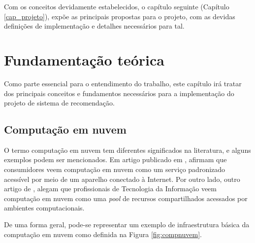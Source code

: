 \documentclass[
	12pt,				%
	openright,			%
	twoside,			%
	a4paper,			%
	english,			%
	french,				%
	spanish,			%
	brazil				%
	]{abntex2}
\begin{document}
Com os conceitos devidamente estabelecidos, o capítulo seguinte (Capítulo \ref{cap_projeto}), expõe as principais propostas para o projeto, com as devidas definições de implementação e detalhes necessários para tal.


\chapter{Fundamentação teórica}\label{cap_conceitos}

Como parte essencial para o entendimento do trabalho, este capítulo irá tratar dos principais conceitos e fundamentos necessários para a implementação do projeto de sistema de recomendação.

\section{Computação em nuvem}\label{sec_comp_nuv}

O termo computação em nuvem tem diferentes significados na literatura, e alguns exemplos podem ser mencionados. Em artigo publicado em \citeyear{fernando2013mobile}, \citeauthor{fernando2013mobile} afirmam que consumidores veem computação em nuvem como um serviço padronizado acessível por meio de um aparelho conectado à Internet. Por outro lado, outro artigo de \citeyear{mazhelis2012economic}, \citeauthor{mazhelis2012economic} alegam que profissionais de Tecnologia da Informação veem computação em nuvem como uma \emph{pool} de recursos compartilhados acessados por ambientes computacionais. \cite[p. 1]{khan2018cloud}

De uma forma geral, pode-se representar um exemplo de infraestrutura básica da computação em nuvem como definida na Figura \ref{fig:compnuvem}.
\end{document}
